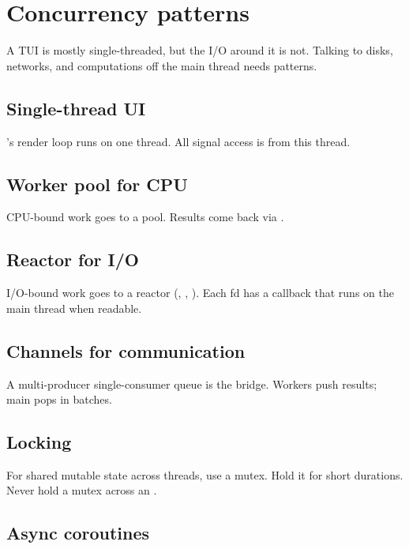 \chapter{Concurrency patterns}
\label{ch:concurrency}

\begin{aside}
A TUI is mostly single-threaded, but the I/O around it is
not. Talking to disks, networks, and computations off the
main thread needs patterns.
\end{aside}

\section{Single-thread UI}

\maya{}'s render loop runs on one thread. All signal
access is from this thread.

\section{Worker pool for CPU}

CPU-bound work goes to a pool. Results come back via
.

\section{Reactor for I/O}

I/O-bound work goes to a reactor (,
, ). Each fd has a callback that
runs on the main thread when readable.

\section{Channels for communication}

A multi-producer single-consumer queue is the bridge.
Workers push results; main pops in batches.

\section{Locking}

For shared mutable state across threads, use a mutex. Hold
it for short durations. Never hold a mutex across an
.

\section{Async coroutines}

